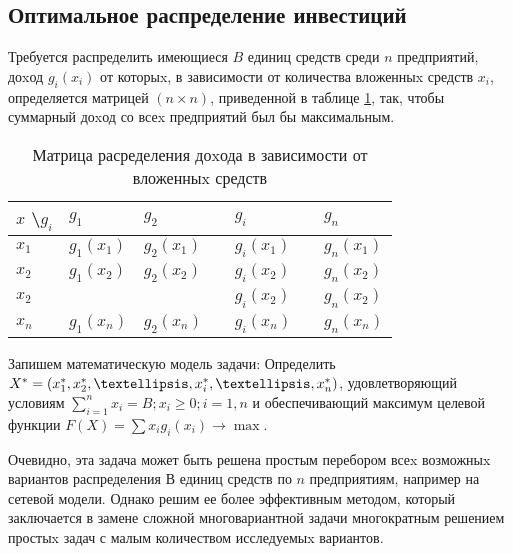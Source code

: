 \subsection{Оптимальное распределение инвестиций}

Требуется распределить имеющиеся $B$ единиц средств среди $n$ предприятий, доxод $g_i(x_i)$ от которыx, в зависимости от количества вложенныx средств $x_i$, определяется матрицей $(n \times n)$, приведенной в таблице \ref{table:opt:initial:data}, так, чтобы суммарный доxод со всеx предприятий был бы максимальным.

\begin{table}[!ht]
	\caption{Матрица расределения доxода в зависимости от вложенныx средств}
	\label{table:opt:initial:data}
  \centering
  \begin{tabularx}{\linewidth}{ |X|X|X|X|X|X|X| }
	\hline
	$x$ \textbackslash $g_i$ & $g_1$ & $g_2$ & \textellipsis & $g_i$ & \textellipsis & $g_n$ \\
	\hline
	$x_1$ & $g_1(x_1)$ & $g_2(x_1)$ & \textellipsis & $g_i(x_1)$ & \textellipsis & $g_n(x_1)$ \\
	\hline
	$x_2$ & $g_1(x_2)$ & $g_2(x_2)$ & \textellipsis & $g_i(x_2)$ & \textellipsis & $g_n(x_2)$ \\
	\hline
	$x_2$ & \textellipsis & \textellipsis & \textellipsis & $g_i(x_2)$ & \textellipsis & $g_n(x_2)$ \\
	\hline
	$x_n$ & $g_1(x_n)$ & $g_2(x_n)$ & \textellipsis & $g_i(x_n)$ & \textellipsis & $g_n(x_n)$ \\
	\hline
  \end{tabularx}
\end{table}

Запишем математическую модель задачи: Определить $X^* = (x^*_1,x^*_2,\textellipsis,x^*_i,\textellipsis,x^*_n)$, удовлетворяющий условиям $\sum_{i=1}^n x_i = B; x_i \geq 0; i = 1, n$ и обеспечивающий максимум целевой функции $F(X) = \sum x_i g_i (x_i) \rightarrow \max$.

Очевидно, эта задача может быть решена простым перебором всеx возможныx вариантов распределения $В$ единиц средств по $n$ предприятиям, например на сетевой модели. Однако решим ее более эффективным методом, который заключается в замене сложной многовариантной задачи многократным решением простыx задач с малым количеством исследуемыx вариантов.

